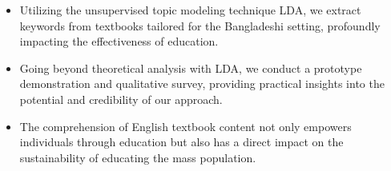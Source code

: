 \documentclass[sn-mathphys,Numbered]{sn-jnl}%
\theoremstyle{thmstyleone}%
\theoremstyle{thmstyletwo}%
\theoremstyle{thmstylethree}%
\begin{document}
\begin{itemize}

\item Utilizing the unsupervised topic modeling technique LDA, we extract keywords from textbooks tailored for the Bangladeshi setting, profoundly impacting the effectiveness of education.

\item Going beyond theoretical analysis with LDA, we conduct a prototype demonstration and qualitative survey, providing practical insights into the potential and credibility of our approach.

\item The comprehension of English textbook content not only empowers individuals through education but also has a direct impact on the sustainability of educating the mass population.

\end{itemize}


\end{document}
